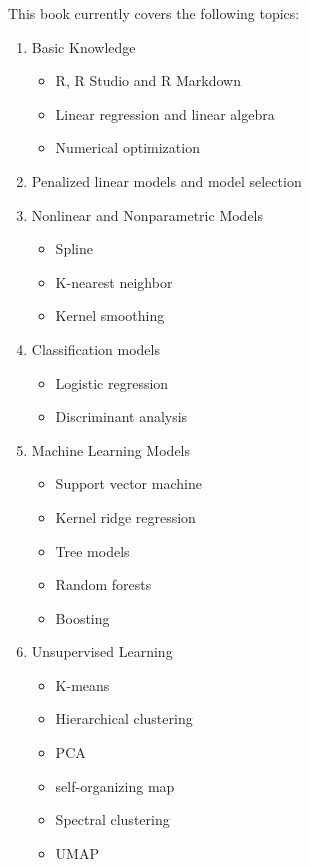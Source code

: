 \documentclass[
]{book}
\providecommand{\tightlist}{%
  \setlength{\itemsep}{0pt}\setlength{\parskip}{0pt}}
\theoremstyle{definition}
\theoremstyle{definition}
\theoremstyle{definition}
\theoremstyle{definition}
\theoremstyle{remark}
\begin{document}
This book currently covers the following topics:

\begin{enumerate}
\def\labelenumi{\arabic{enumi}.}
\tightlist
\item
  Basic Knowledge

  \begin{itemize}
  \tightlist
  \item
    R, R Studio and R Markdown
  \item
    Linear regression and linear algebra
  \item
    Numerical optimization
  \end{itemize}
\item
  Penalized linear models and model selection
\item
  Nonlinear and Nonparametric Models

  \begin{itemize}
  \tightlist
  \item
    Spline
  \item
    K-nearest neighbor
  \item
    Kernel smoothing
  \end{itemize}
\item
  Classification models

  \begin{itemize}
  \tightlist
  \item
    Logistic regression
  \item
    Discriminant analysis
  \end{itemize}
\item
  Machine Learning Models

  \begin{itemize}
  \tightlist
  \item
    Support vector machine
  \item
    Kernel ridge regression
  \item
    Tree models
  \item
    Random forests
  \item
    Boosting
  \end{itemize}
\item
  Unsupervised Learning

  \begin{itemize}
  \tightlist
  \item
    K-means
  \item
    Hierarchical clustering
  \item
    PCA
  \item
    self-organizing map
  \item
    Spectral clustering
  \item
    UMAP
  \end{itemize}
\end{enumerate}
\end{document}
